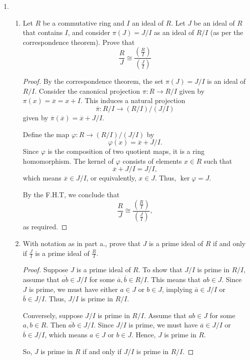\documentclass[12pt]{article}
\begin{document}
\begin{enumerate}
		
		\item 
		\begin{enumerate}
			\item Let $R$ be a commutative ring and $I$ an ideal of $R$. Let $J$ be an ideal of $R$ that contains $I$, and consider $\pi(J) = J/I$ as an ideal of $R/I$ (as per the correspondence theorem). Prove that
			\[\frac{R}{J} \cong \frac{\left(\frac{R}{I}\right)}{\left(\frac{J}{I}\right)}\]
			\begin{proof}
				By the correspondence theorem, the set $\pi(J) = J/I$ is an ideal of $R/I$.
				Consider the canonical projection $\pi: R \to R/I$ given by $\pi(x) = \overline{x} = x + I$. This induces a natural projection
				\[
				\overline{\pi}: R/I \to (R/I)/(J/I)
				\]
				given by $\overline{\pi}(\overline{x}) = \overline{x} + J/I$. 
				
				Define the map $\varphi: R \to (R/I)/(J/I)$ by 
				\[
				\varphi(x) = \overline{x} + J/I.
				\]
				Since $\varphi$ is the composition of two quotient maps, it is a ring homomorphism. The kernel of $\varphi$ consists of elements $x \in R$ such that 
				\[
				\overline{x} + J/I = J/I,
				\]
				which means $\overline{x} \in J/I$, or equivalently, $x \in J$. Thus, $\ker \varphi = J$.
				
				By the F.H.T, we conclude that 
				\[
				\frac{R}{J} \cong \frac{\left(\frac{R}{I}\right)}{\left(\frac{J}{I}\right)},
				\]
				as required.

			\end{proof}
			
			\item With notation as in part a., prove that $J$ is a prime ideal of $R$ if and only if $\frac{J}{I}$ is a prime ideal of $\frac{R}{I}$.
			\begin{proof}
				Suppose $J$ is a prime ideal of $R$. To show that $J/I$ is prime in $R/I$, assume that $\overline{ab} \in J/I$ for some $\overline{a}, \overline{b} \in R/I$. This means that $ab \in J$. Since $J$ is prime, we must have either $a \in J$ or $b \in J$, implying $\overline{a} \in J/I$ or $\overline{b} \in J/I$. Thus, $J/I$ is prime in $R/I$.
				
				Conversely, suppose $J/I$ is prime in $R/I$. Assume that $ab \in J$ for some $a, b \in R$. Then $\overline{ab} \in J/I$. Since $J/I$ is prime, we must have $\overline{a} \in J/I$ or $\overline{b} \in J/I$, which means $a \in J$ or $b \in J$. Hence, $J$ is prime in $R$.
				
				So, $J$ is prime in $R$ if and only if $J/I$ is prime in $R/I$.
				

\end{proof}
\end{enumerate}
\end{enumerate}
\end{document}
